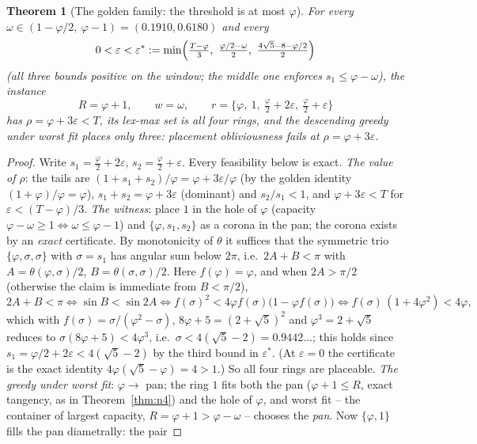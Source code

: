 \documentclass[11pt]{article}
\newtheorem{theorem}{Theorem}
\theoremstyle{definition}
\begin{document}
\begin{theorem}[The golden family: the threshold is at most $\varphi$]
\label{thm:golden}
For every $\omega\in(1-\varphi/2,\ \varphi-1)=(0.1910,0.6180)$ and every
\[
0<\varepsilon<\varepsilon^\ast:=
\min\Bigl(\tfrac{T-\varphi}{3},\ \tfrac{\varphi/2-\omega}{2},\
\tfrac{4\sqrt5-8-\varphi/2}{2}\Bigr)
\]
(all three bounds positive on the window; the middle one enforces
$s_1\le\varphi-\omega$), the instance
\[
R=\varphi+1,\qquad w=\omega,\qquad
r=\bigl\{\varphi,\ 1,\ \tfrac\varphi2+2\varepsilon,\
\tfrac\varphi2+\varepsilon\bigr\}
\]
has $\rho=\varphi+3\varepsilon<T$, its lex-max set is all four rings, and
the descending greedy under worst fit places only three: placement
obliviousness fails at $\rho=\varphi+3\varepsilon$.
\end{theorem}
\begin{proof}
Write $s_1=\tfrac\varphi2+2\varepsilon$, $s_2=\tfrac\varphi2+\varepsilon$.
Every feasibility below is exact. \emph{The value of $\rho$}: the tails
are $(1+s_1+s_2)/\varphi=\varphi+3\varepsilon/\varphi$ (by the golden
identity $(1+\varphi)/\varphi=\varphi$), $s_1+s_2=\varphi+3\varepsilon$
(dominant) and $s_2/s_1<1$, and $\varphi+3\varepsilon<T$ for
$\varepsilon<(T-\varphi)/3$. \emph{The witness}: place $1$ in the hole of
$\varphi$ (capacity $\varphi-\omega\ge1\iff\omega\le\varphi-1$) and
$\{\varphi,s_1,s_2\}$ as a corona in the pan; the corona exists by an
\emph{exact} certificate. By monotonicity of $\theta$ it suffices that
the symmetric trio $\{\varphi,\sigma,\sigma\}$ with $\sigma=s_1$ has
angular sum below $2\pi$, i.e.\ $2A+B<\pi$ with
$A=\theta(\varphi,\sigma)/2$, $B=\theta(\sigma,\sigma)/2$. Here
$f(\varphi)=\varphi$, and when $2A>\pi/2$ (otherwise the claim is
immediate from $B<\pi/2$),
\[
2A+B<\pi\iff\sin B<\sin2A
\iff f(\sigma)^2<4\varphi f(\sigma)\bigl(1-\varphi f(\sigma)\bigr)
\iff f(\sigma)\,(1+4\varphi^2)<4\varphi ,
\]
which with $f(\sigma)=\sigma/(\varphi^2-\sigma)$,
$8\varphi+5=(2+\sqrt5)^2$ and $\varphi^3=2+\sqrt5$ reduces to
$\sigma(8\varphi+5)<4\varphi^3$, i.e.\
$\sigma<4(\sqrt5-2)=0.9442\dots$; this holds since
$s_1=\varphi/2+2\varepsilon<4(\sqrt5-2)$ by the third bound in
$\varepsilon^\ast$. (At $\varepsilon=0$ the certificate is the exact
identity $4\varphi(\sqrt5-\varphi)=4>1$.) So all four rings are
placeable.
\emph{The greedy under worst fit}: $\varphi\to$ pan; the ring $1$ fits
both the pan ($\varphi+1\le R$, exact tangency, as in
Theorem~\ref{thm:n4}) and the hole of $\varphi$, and worst fit -- the
container of largest capacity, $R=\varphi+1>\varphi-\omega$ -- chooses
the \emph{pan}. Now $\{\varphi,1\}$ fills the pan diametrally: the pair

\end{proof}
\end{document}
